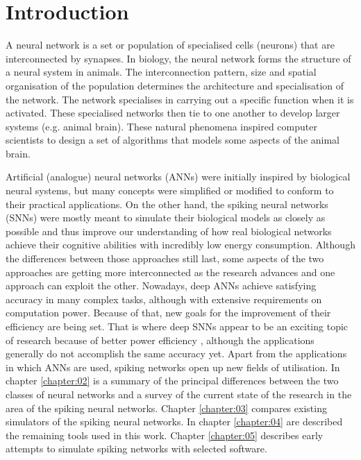 \chapter{Introduction} \label{chapter:01}

A neural network is a set or population of specialised cells (neurons) that are interconnected by synapses. In biology, the neural network forms the structure of a neural system in animals. The interconnection pattern, size and spatial organisation of the population determines the architecture and specialisation of the network. The network specialises in carrying out a specific function when it is activated. These specialised networks then tie to one another to develop larger systems (e.g. animal brain). These natural phenomena inspired computer scientists to design a set of algorithms that models some aspects of the animal brain. 

Artificial (analogue) neural networks (ANNs) were initially inspired by biological neural systems, but many concepts were simplified or modified to conform to their practical applications. On the other hand, the spiking neural networks (SNNs) were mostly meant to simulate their biological models as closely as possible and thus improve our understanding of how real biological networks achieve their cognitive abilities with incredibly low energy consumption. Although the differences between those approaches still last, some aspects of the two approaches are getting more interconnected as the research advances and one approach can exploit the other. Nowadays, deep ANNs achieve satisfying accuracy in many complex tasks, although with extensive requirements on computation power. Because of that, new goals for the improvement of their efficiency are being set. That is where deep SNNs appear to be an exciting topic of research because of better power efficiency \cite{caoSpikingDeepConvolutional2015, tavanaeiDeepLearningSpiking2019}, although the applications generally do not accomplish the same accuracy yet. Apart from the applications in which ANNs are used, spiking networks open up new fields of utilisation. In chapter \ref{chapter:02} is a summary of the principal differences between the two classes of neural networks and a survey of the current state of the research in the area of the spiking neural networks. Chapter \ref{chapter:03} compares existing simulators of the spiking neural networks. In chapter \ref{chapter:04} are described the remaining tools used in this work. Chapter \ref{chapter:05} describes early attempts to simulate spiking networks with selected software.
